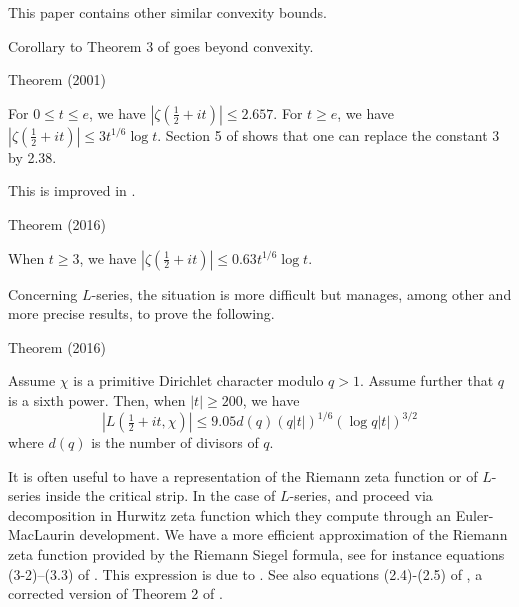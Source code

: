 This paper contains other similar convexity bounds.


Corollary to Theorem 3
of \cite{Cheng-Graham*01} goes beyond convexity. 

\par 
\begin{thm}{Theorem (2001)}

  For $0\le t\le e$, we have $|\zeta(\tfrac12+it)|\le 2.657$. For $t\ge e$, we
  have $|\zeta(\tfrac12+it)|\le 3t^{1/6}\log t$.
  Section 5 of \cite{Trudgian*13}
  shows that one can replace the constant 3 by 2.38.
\end{thm}


This is improved in
\cite{Hiary*16}.
\par 
\begin{thm}{Theorem (2016)}

  When $t\ge 3$, we
  have $|\zeta(\tfrac12+it)|\le 0.63t^{1/6}\log t$.
\end{thm}


Concerning $L$-series, the situation is more difficult but
\cite{Hiary*16b}
manages, among other and more precise results, to prove the following.
\par 
\begin{thm}{Theorem (2016)}

  Assume $\chi$ is a primitive Dirichlet character modulo $q>1$. Assume
  further that $q$ is a sixth power. Then, when $|t|\ge 200$, we
    have
    $$|L(\tfrac12+it,\chi)|\le 9.05d(q) (q|t|)^{1/6}(\log
    q|t|)^{3/2}$$
    where $d(q)$ is the number of divisors of $q$.
\end{thm}


It is often useful to have a representation of the Riemann zeta function
or of $L$-series inside the critical strip. In the case of $L$-series,
\cite{Spira*69}
and
\cite{Rumely*93}
proceed via decomposition in Hurwitz zeta function which they compute through
an Euler-MacLaurin development. We have a more efficient approximation of the
Riemann zeta function provided by the Riemann Siegel formula, see
for instance equations (3-2)--(3.3)
of \cite{Odlyzko*87}. This
expression is due to 
\cite{Gabcke*79}.
See also 
equations (2.4)-(2.5) of
\cite{Lehman*66}, a corrected
version of Theorem 2 of \cite{Titchmarsh*47}.


